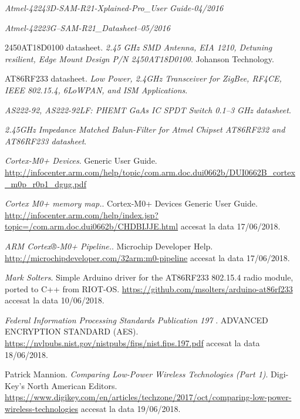 \documentclass[12pt,a4paper]{report}
\begin{document}
\begin{thebibliography}{9}
\textit{Atmel-42243D-SAM-R21-Xplained-Pro\_User Guide-04/2016}

\textit{Atmel-42223G–SAM-R21\_Datasheet–05/2016}

2450AT18D0100 datasheet. 
\textit{2.45 GHz SMD Antenna, EIA 1210, Detuning resilient, Edge Mount Design P/N 2450AT18D0100}.
Johanson Technology.

AT86RF233 datasheet. 
\textit{Low Power, 2.4GHz Transceiver for ZigBee, RF4CE, IEEE 802.15.4, 6LoWPAN, and ISM Applications}.

\textit{AS222-92, AS222-92LF: PHEMT GaAs IC SPDT Switch 0.1–3 GHz datasheet}.

\textit{2.45GHz Impedance Matched Balun-Filter for Atmel Chipset AT86RF232 and AT86RF233 datasheet}.

\textit{Cortex-M0+ Devices}.
Generic User Guide.
\href{http://infocenter.arm.com/help/topic/com.arm.doc.dui0662b/DUI0662B\_cortex\_m0p\_r0p1\_dgug.pdf}{http://infocenter.arm.com/help/topic/com.arm.doc.dui0662b/DUI0662B\_cortex\_m0p\_r0p1\_dgug.pdf}

\textit{Cortex M0+ memory map.}.
Cortex-M0+ Devices Generic User Guide. 
\href{http://infocenter.arm.com/help/index.jsp?topic=/com.arm.doc.dui0662b/CHDBIJJE.html}{http://infocenter.arm.com/help/index.jsp?topic=/com.arm.doc.dui0662b/CHDBIJJE.html} accesat la data 17/06/2018.

\textit{ARM Cortex®-M0+ Pipeline.}.
Microchip Developer Help.
\href{http://microchipdeveloper.com/32arm:m0-pipeline}{http://microchipdeveloper.com/32arm:m0-pipeline} accesat la data 17/06/2018.

\textit{Mark Solters}.
Simple Arduino driver for the AT86RF233 802.15.4 radio module, ported to C++ from RIOT-OS.
\href{https://github.com/msolters/arduino-at86rf233}{https://github.com/msolters/arduino-at86rf233} accesat la data 10/06/2018.

\textit{Federal Information Processing Standards Publication 197 }.
ADVANCED ENCRYPTION STANDARD (AES).
\href{https://nvlpubs.nist.gov/nistpubs/fips/nist.fips.197.pdf}{https://nvlpubs.nist.gov/nistpubs/fips/nist.fips.197.pdf} accesat la data 18/06/2018.

Patrick Mannion.
\textit{Comparing Low-Power Wireless Technologies (Part 1)}.
Digi-Key's North American Editors.
\href{https://www.digikey.com/en/articles/techzone/2017/oct/comparing-low-power-wireless-technologies}{https://www.digikey.com/en/articles/techzone/2017/oct/comparing-low-power-wireless-technologies} accesat la data 19/06/2018.


\end{thebibliography}
\end{document}
